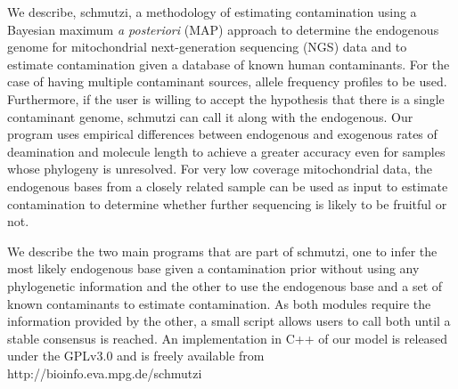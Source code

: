 \documentclass[a4paper,12pt]{article}
\begin{document}
We describe, schmutzi, a methodology of estimating contamination using a Bayesian maximum {\it a posteriori} (MAP) approach to determine the endogenous genome for mitochondrial next-generation sequencing (NGS) data and to estimate contamination given a database of known human contaminants. For the case of having multiple contaminant sources, allele frequency profiles to be used. Furthermore, if the user is willing to accept the hypothesis that there is a single contaminant genome, schmutzi can call it along with the endogenous. Our program uses empirical differences between endogenous and exogenous rates of deamination and molecule length to achieve a greater accuracy even for samples whose phylogeny is unresolved. For very low coverage mitochondrial data, the endogenous bases from a closely related sample can be used as input to estimate contamination to determine whether further sequencing is likely to be fruitful or not.

We describe the two main programs that are part of schmutzi, one to infer the most likely endogenous base given a contamination prior without using any phylogenetic information and the other to use the endogenous base and a set of known contaminants to estimate contamination. As both modules require the information provided by the other, a small script allows users to call both until a stable consensus is reached. An implementation in C++ of our model is released under the GPLv3.0 and is freely available from http://bioinfo.eva.mpg.de/schmutzi






\clearpage
\end{document}
